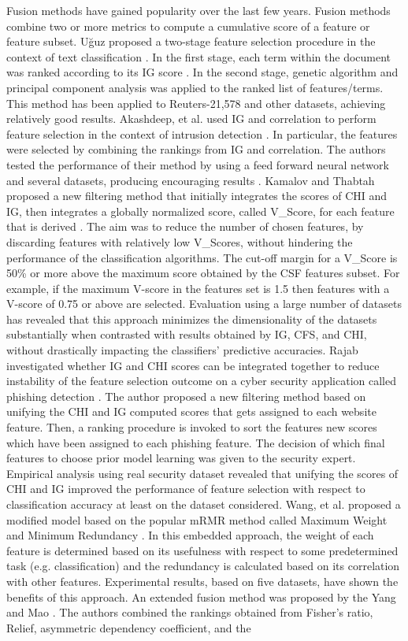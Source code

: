 \documentclass[review]{elsarticle}
\begin{document}
Fusion methods have gained popularity over the last few years. Fusion methods combine two or more metrics to compute a cumulative score of a feature or feature subset. Uğuz  proposed a two-stage feature selection procedure in the context of text classification \cite{Uguz2011}. In the first stage, each term within the document was ranked according to its IG score \cite{Salzberg1994}. In the second stage, genetic algorithm and principal component analysis was applied to the ranked list of features/terms.  This method has been applied to Reuters-21,578 and other datasets, achieving relatively good results. Akashdeep, et al. used IG and correlation to perform feature selection in the context of intrusion detection \cite{Abedinia2017}. In particular, the features were selected by combining the rankings from IG and correlation. The authors tested the performance of their method by using a feed forward neural network  and several datasets, producing encouraging results \cite{Shahamiri2012}. Kamalov and Thabtah proposed a new filtering method that initially integrates the scores of CHI and IG, then integrates a globally normalized score, called V\_Score, for each feature that is derived \cite{Kamalov2017}. The aim was to reduce the number of chosen features, by discarding features with relatively low V\_Scores, without hindering the performance of the classification algorithms. The cut-off margin for a V\_Score is 50\% or more above the maximum score obtained by the CSF features subset. For example, if the maximum V-score in the features set is 1.5 then features with a V-score of 0.75 or above are selected. Evaluation using a large number of datasets has revealed that this approach minimizes the dimensionality of the datasets substantially when contrasted with results obtained by IG, CFS, and CHI, without drastically impacting the classifiers’ predictive accuracies.  Rajab investigated whether IG and CHI scores can be integrated together to reduce instability of the feature selection outcome on a cyber security application called phishing detection \cite{Rajab2017}. The author proposed a new filtering method based on unifying the CHI and IG computed  scores that gets assigned to each website feature. Then, a ranking procedure is invoked to sort the features new scores which have been assigned to each phishing feature. The decision of which final features to choose prior model learning was given to the security expert. Empirical analysis using real security dataset revealed that unifying the scores of CHI and IG improved the performance of feature selection with respect to classification accuracy at least on the dataset considered. Wang, et al. proposed a modified model based on the popular mRMR method called Maximum Weight and Minimum Redundancy  \cite{Yousef2016,Wang2013}. In this embedded approach, the weight of each feature is determined based on its usefulness with respect to some predetermined task (e.g. classification) and the redundancy is calculated based on its correlation with other features. Experimental results, based on five datasets, have shown the benefits of this approach. An extended fusion method was proposed by the Yang and Mao  \cite{FengYang2011}. The authors combined the rankings obtained from Fisher’s ratio, Relief, asymmetric dependency coefficient, and the 
\end{document}
